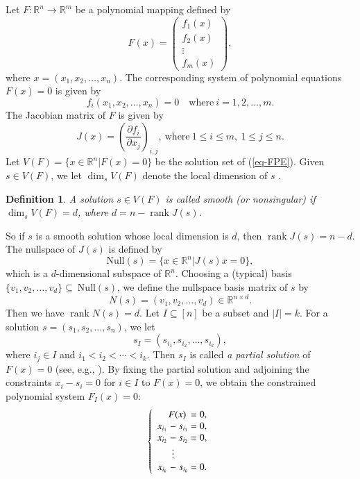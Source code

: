 \documentclass[10pt,a4paper]{amsart}
\newtheorem{definition}[theorem]{Definition}
\numberwithin{equation}{section}
\begin{document}
Let $F: \mathbb{R}^n\to \mathbb{R}^m$ be a polynomial mapping defined by 
$$F(x)=
\left(
\begin{array}{c}
f_1(x)\\
f_2(x)\\
\vdots\\
f_m(x)
\end{array}
\right),
$$
where $x=(x_1,x_2,\ldots,x_n)$. The corresponding system of polynomial equations $F(x)=0$ is given by
\begin{equation}\label{eq-FPE}
f_i(x_1,x_2,\ldots,x_n)=0\quad\text{where}~i=1,2,\ldots,m.
\end{equation}
The Jacobian matrix of $F$ is given by 
\begin{equation}\label{eq-jac}
J(x) =\left(\frac{\partial f_i}{\partial x_j}\right)_{i,j},~\text{where}~1\leq i\leq m,~1\leq j\leq n.
\end{equation}
Let $V(F)=\{x\in \mathbb{R}^n|F(x)=0\}$ be the solution set of (\ref{eq-FPE}). Given $s\in V(F)$, we let $\dim_s V(F)$ denote the local dimension of $s$ \cite{cox25,li25def}.  
\begin{definition}\cite{cox25}
A solution $s\in V(F)$ is called \emph{smooth} (or nonsingular) if
$\dim_s V(F)=d$, where $d=n-\operatorname{rank}J(s)$.
\end{definition}
So if $s$ is a smooth solution whose local dimension is $d$, then 
$\operatorname{rank}J(s)=n-d$. The nullspace of $J(s)$ is defined by
$$\mathrm{Null}(s)=\{x\in \mathbb{R}^n| J(s)x=0\},$$
which is a $d$-dimensional subspace of $\mathbb{R}^n$.
Choosing a (typical) basis $\{v_1,v_2,\ldots,v_d\} \subseteq~\mathrm{Null}(s)$, we define the nullspace basis matrix of $s$ by
\begin{equation}\label{eq-ns}
N(s)=(v_1,v_2,\ldots,v_d)\in \mathbb{R}^{n\times d}.
\end{equation}
Then we have $\operatorname{rank}N(s)=d$. Let $I\subseteq [n]$ be a subset and $|I|=k$. For a solution $s=(s_1,s_2,\ldots,s_n)$, we let 
$$s_I=(s_{i_1},s_{i_2},\ldots,s_{i_k}),$$
where $i_j\in I$ and $i_1<i_2<\cdots<i_k$. Then $s_I$ is called \emph{a partial solution} of $F(x)=0$ (see, e.g., \cite{cox25}). By fixing the partial solution and adjoining the constraints $x_i-s_i=0$ for $i\in I$ to $F(x)=0$, we obtain the constrained polynomial system $F_I(x)=0$:
\begin{equation}\label{eq-FI}
\left\{
\begin{array}{r@{\;}c@{\;}r@{\;}c@{\;}l}
\multicolumn{3}{r}{F(x)} & = & 0,\\
x_{i_1} & - & s_{i_1} & = & 0,\\
x_{i_2} & - & s_{i_2} & = & 0,\\
        & \vdots &     &   &   \\
x_{i_k} & - & s_{i_k} & = & 0.
\end{array}
\right.
\end{equation}
\end{document}
